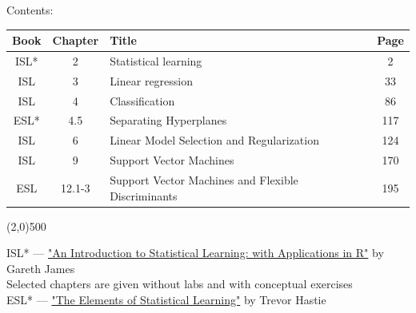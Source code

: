 \documentclass[a4paper,12pt,titlepage]{article} %
\begin{document}
\begin{titlepage}
\vspace{40pt}

\begin{center}
	{\large Contents:}
\end{center}
\begin{tabularx}{\textwidth}{|c|c|X|c|}
	\hline
	Book & Chapter & Title & Page \\
	\hline
	ISL* & 2 & Statistical learning & 2 \\
	\hline
	ISL & 3 & Linear regression & 33 \\
	\hline
	ISL & 4 & Classification & 86 \\
	\hline
	ESL* & 4.5 & Separating Hyperplanes & 117 \\
	\hline
	ISL & 6 & Linear Model Selection and Regularization & 124 \\
	\hline
	ISL & 9 & Support Vector Machines & 170 \\
	\hline
	ESL & 12.1-3 & Support Vector Machines and Flexible Discriminants & 195 \\
	\hline
\end{tabularx}

\vspace{\fill}
\begin{center}
	\line(2,0){500}
\end{center}

{\small ISL* --- \href{http://www.springer.com/it/book/9781461471370}{"An Introduction to Statistical Learning: with Applications in R"} by Gareth James\\
Selected chapters are given without labs and with conceptual exercises\\

ESL* --- \href{http://www.springer.com/it/book/9780387848570}{"The Elements of Statistical Learning"} by Trevor Hastie}

\end{titlepage}

\end{document}
